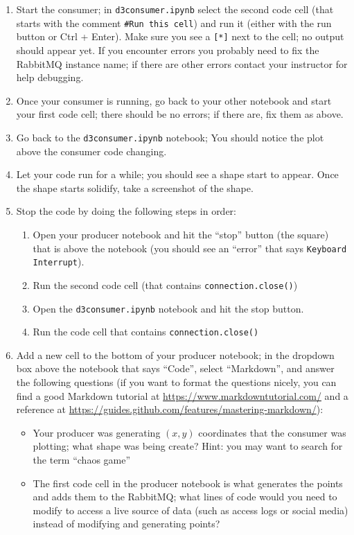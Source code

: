 \documentclass[letterpaper,10pt]{article}
\begin{document}
\begin{enumerate}
\begin{center}
		\end{center}
	\item Start the consumer; in \texttt{d3consumer.ipynb} select the second code cell (that starts with the comment \texttt{\#Run this cell}) and run it (either with the run button or Ctrl + Enter).  Make sure you see a \texttt{[*]} next to the cell; no output should appear yet.  If you encounter errors you probably need to fix the RabbitMQ instance name; if there are other errors contact your instructor for help debugging.
	\item Once your consumer is running, go back to your other notebook and start your first code cell; there should be no errors; if there are, fix them as above.
	\item Go back to the \texttt{d3consumer.ipynb} notebook; You should notice the plot above the consumer code changing.
	\item Let your code run for a while; you should see a shape start to appear.  Once the shape starts solidify, take a screenshot of the shape.
	\item Stop the code by doing the following steps in order:
		\begin{enumerate}
			\item Open your producer notebook and hit the ``stop'' button (the square) that is above the notebook (you should see an ``error'' that says \texttt{Keyboard Interrupt}).
			\item Run the second code cell (that contains \texttt{connection.close()})
			\item Open the \texttt{d3consumer.ipynb} notebook and hit the stop button.
			\item Run the code cell that contains \texttt{connection.close()}
		\end{enumerate}
	\item Add a new cell to the bottom of your producer notebook; in the dropdown box above the notebook that says ``Code'', select ``Markdown'', and answer the following questions (if you want to format the questions nicely, you can find a good Markdown tutorial at \url{https://www.markdowntutorial.com/} and a reference at \url{https://guides.github.com/features/mastering-markdown/}):
		\begin{itemize}
			\item Your producer was generating $(x,y)$ coordinates that the consumer was plotting; what shape was being create? Hint: you may want to search for the term ``chaos game''
			\item The first code cell in the producer notebook is what generates the points and adds them to the RabbitMQ; what lines of code would you need to modify to access a live source of data (such as access logs or social media) instead of modifying and generating points?

\end{itemize}
\end{enumerate}
\end{document}
